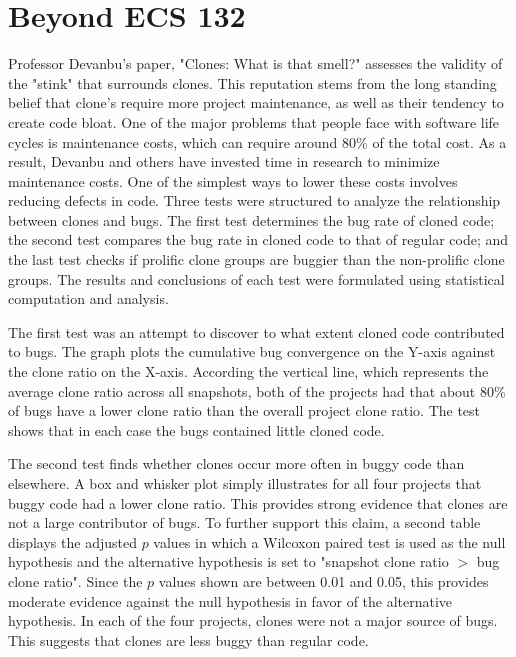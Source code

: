 \documentclass{article}
\begin{document}

\section{Beyond ECS 132}

Professor Devanbu's paper, "Clones: What is that smell?" assesses the validity of the "stink"
that surrounds clones.  This reputation stems from the long standing belief that clone's require
more project maintenance, as well as their tendency to create code bloat. One of the major
problems that people face with software life cycles is maintenance costs, which can require
around 80\% of the total cost. As a result, Devanbu and others have invested time in research
to minimize maintenance costs. One of the simplest ways to lower these costs involves
reducing defects in code. Three tests were structured to analyze the relationship between
clones and bugs. The first test determines the bug rate of cloned code; the second test
compares the bug rate in cloned code to that of regular code; and the last test checks
if prolific clone groups are buggier than the non-prolific clone groups. The results and
conclusions of each test were formulated using statistical computation and analysis.

The first test was an attempt to discover to what extent cloned code contributed to bugs.
The graph plots the cumulative bug convergence on the Y-axis against the clone ratio on the
X-axis. According the vertical line, which represents the average clone ratio across all
snapshots, both of the projects had that about 80\% of bugs have a lower clone ratio than
the overall project clone ratio. The test shows that in each case the bugs contained little
cloned code.

The second test finds whether clones occur more often in buggy code than elsewhere. A box
and whisker plot simply illustrates for all four projects that buggy code had a lower clone
ratio. This provides strong evidence that clones are not a large contributor of bugs. To
further support this claim, a second table displays the adjusted $p$ values in which a Wilcoxon
paired test is used as the null hypothesis and the alternative hypothesis is set to "snapshot
clone ratio $>$ bug clone ratio". Since the $p$ values shown are between 0.01 and 0.05, this
provides moderate evidence against the null hypothesis in favor of the alternative hypothesis.
In each of the four projects, clones were not a major source of bugs. This suggests that clones
are less buggy than regular code.
\end{document}
